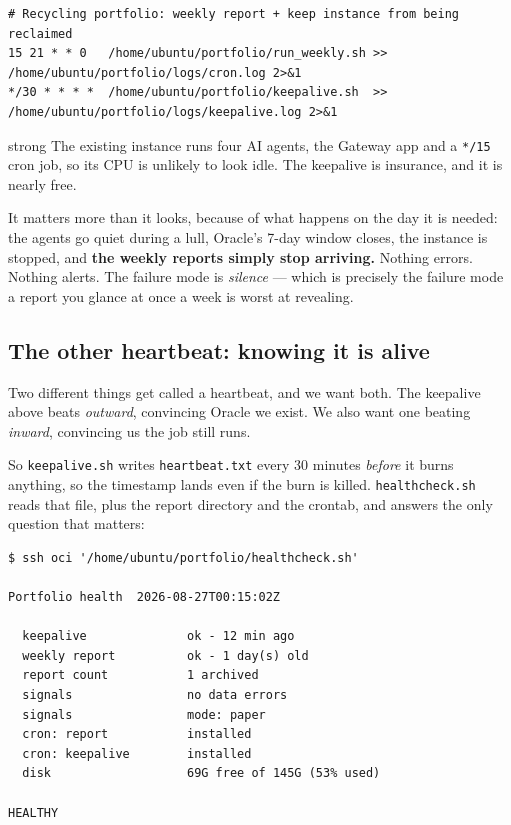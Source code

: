 \documentclass[11pt,a4paper]{article}
\begin{document}
\begin{codebox}
\begin{lstlisting}[style=shell]
# Recycling portfolio: weekly report + keep instance from being reclaimed
15 21 * * 0   /home/ubuntu/portfolio/run_weekly.sh >> /home/ubuntu/portfolio/logs/cron.log 2>&1
*/30 * * * *  /home/ubuntu/portfolio/keepalive.sh  >> /home/ubuntu/portfolio/logs/keepalive.log 2>&1
\end{lstlisting}
\end{codebox}

\begin{resultbox}{strong}
The existing instance runs four AI agents, the Gateway app and a
\texttt{*/15} cron job, so its CPU is unlikely to look idle. The
keepalive is insurance, and it is nearly free.

\vspace{0.4em}
It matters more than it looks, because of what happens on the day it is
needed: the agents go quiet during a lull, Oracle's 7-day window closes,
the instance is stopped, and \textbf{the weekly reports simply stop
arriving.} Nothing errors. Nothing alerts. The failure mode is
\emph{silence} --- which is precisely the failure mode a report you
glance at once a week is worst at revealing.
\end{resultbox}

\subsection{The other heartbeat: knowing it is alive}

Two different things get called a heartbeat, and we want both. The
keepalive above beats \emph{outward}, convincing Oracle we exist. We
also want one beating \emph{inward}, convincing us the job still runs.

So \texttt{keepalive.sh} writes \texttt{heartbeat.txt} every 30 minutes
\emph{before} it burns anything, so the timestamp lands even if the burn
is killed. \texttt{healthcheck.sh} reads that file, plus the report
directory and the crontab, and answers the only question that matters:

\begin{codebox}
\begin{lstlisting}[style=shell]
$ ssh oci '/home/ubuntu/portfolio/healthcheck.sh'

Portfolio health  2026-08-27T00:15:02Z

  keepalive              ok - 12 min ago
  weekly report          ok - 1 day(s) old
  report count           1 archived
  signals                no data errors
  signals                mode: paper
  cron: report           installed
  cron: keepalive        installed
  disk                   69G free of 145G (53% used)

HEALTHY
\end{lstlisting}
\end{codebox}
\end{document}
